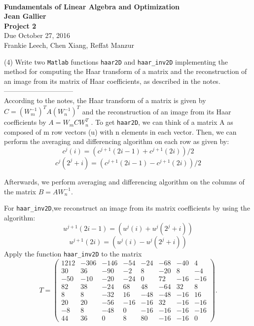 \documentclass[12pt]{article}
\begin{document}
\begin{center}
\\
\vspace{1cm}
{\Large\bf Fundamentals of Linear Algebra and Optimization\\
Jean Gallier \\
\vspace{0.5cm}
Project 2}\\[10pt]
Due October 27, 2016\\
Frankie Leech, Chen Xiang, Reffat Manzur\\
\end{center}

\vspace{0.5cm}

\medskip
(4)
Write two {\tt Matlab} functions {\tt haar2D} and {\tt haar\_inv2D}
implementing the method for computing the Haar transform
of a  matrix and the reconstruction of an image from its matrix of Haar
coefficients, as described in the notes.\\------------------------------\\
According to the notes, the Haar transform of a matrix is given by $C = (W_m^{-1})^T A (W_n^{-1})^T$ and the reconstruction of an image from its Haar coefficients by $A = W_m C W_n^T$ . To get {\tt haar2D}, we can think of a matrix A as    composed of m row vectors (u) with n elements in each vector. Then, we can perform the averaging and differencing algorithm on each row as given by:
$$c^j(i) = (c^{j+1}(2i -1) + c^{j+1}(2i))/2$$  
$$c^j(2^j+i) = (c^{j+1}(2i -1) - c^{j+1}(2i))/2$$ 

Afterwards, we perform averaging and differencing algorithm on the columns of the matrix $B=A W_n^{-1}$.


For {\tt haar\_inv2D},we reconstruct an image from its matrix coefficients by using the algorithm: 
$$u^{j+1}(2i-1) = (u^{j}(i) + u^{j}(2^j+i))$$  
$$u^{j+1}(2i) = (u^{j}(i) - u^{j}(2^j+i))$$
Apply the function {\tt haar\_inv2D} to the matrix
\[
T = 
\begin{pmatrix}
1212 & -306 & -146 & -54 & -24 & -68 & -40 & 4 \\
    30 & 36 & -90 & -2 &  8 & -20 & 8  & -4 \\
    -50 & -10 & -20 & -24 & 0 & 72 & -16 & -16 \\
    82 & 38 & -24 & 68 & 48 & -64 & 32 & 8 \\
    8 & 8 & -32 & 16 & -48 & -48 & -16 & 16 \\
    20 & 20 & -56 & -16 & -16 & 32 & -16 & -16 \\
    -8 & 8 & -48 & 0 & -16 & -16 & -16 &  -16 \\
    44 & 36 & 0 & 8 & 80 & -16 & -16 & 0
\end{pmatrix}.
\]
\end{document}
